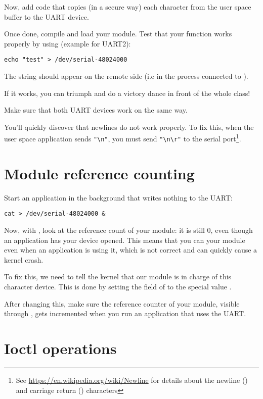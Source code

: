 Now, add code that copies (in a secure way) each character from the
user space buffer to the UART device.

Once done, compile and load your module. Test that your  function
works properly by using (example for UART2):

\begin{verbatim}
echo "test" > /dev/serial-48024000
\end{verbatim}

The  string should appear on the remote side (i.e in
the  process connected to ).

If it works, you can triumph and do a victory dance in front of the
whole class!

Make sure that both UART devices work on the same way.

You'll quickly discover that newlines do not work properly. To fix
this, when the user space application sends \verb+"\n"+, you must send
\verb+"\n\r"+ to the serial port\footnote{See
\url{https://en.wikipedia.org/wiki/Newline} for details about the
newline (\code{\n}) and carriage return (\code{\r}) characters}.

\section{Module reference counting}

Start an application in the background that writes nothing to the
UART:

\begin{verbatim}
cat > /dev/serial-48024000 &
\end{verbatim}

Now, with , look at the reference count of your module: it
is still 0, even though an application has your device opened. This
means that you can  your module even when an application
is using it, which is not correct and can quickly cause a kernel
crash.

To fix this, we need to tell the kernel that our module is in charge
of this character device. This is done by setting the 
field of  to the special value
.

After changing this, make sure the reference counter of your module,
visible through , gets incremented when you run an
application that uses the UART.

\section{Ioctl operations}

